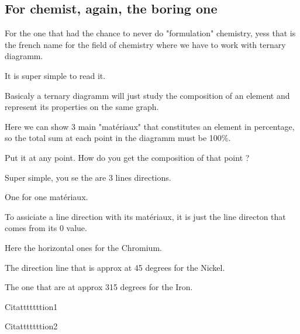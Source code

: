\documentclass{article}
\begin{document}
\subsection{For chemist, again, the boring one}

For the one that had the chance to never do "formulation" chemistry, yess that is the french name for the field of  chemistry where we have to work with ternary diagramm.

It is super simple to read it.

Basicaly a ternary diagramm will just study the composition of an element and represent its properties on the same graph.

Here we can show 3 main "matériaux" that constitutes an element in percentage, so the total sum at each point in the diagramm must be 100\%.

Put it at any point. How do you get the composition of that point ?

Super simple, you se the are 3 lines directions.

One for one matériaux.

To assiciate a line direction with its matériaux, it is just the line directon that comes from its 0 value.

Here the horizontal ones for the Chromium.

The direction line that is approx at 45 degrees for the Nickel.

The one that are at approx 315 degrees for the Iron.


\newpage

\hypertarget{cit1}{Citatttttttion1}

\hypertarget{cit2}{Citatttttttion2}


\newdimen\customdim
\customdim=2cm

\setlength{\parskip}{\dimexpr 2\customdim*2 / 3 + 1cm\relax}

\setlength{\parskip}{\dimexpr 2\customdim\relax}
\end{document}
